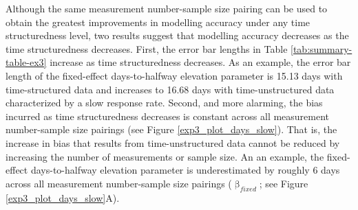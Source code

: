 \documentclass[
12pt, %
twoside,
english]{guelphthesis}
\begin{document}
Although the same measurement number-sample size pairing can be used to obtain the greatest improvements in modelling accuracy under any time structuredness level, two results suggest that modelling accuracy decreases as the time structuredness decreases. First, the error bar lengths in Table \ref{tab:summary-table-ex3} increase as time structuredness decreases. As an example, the error bar length of the fixed-effect days-to-halfway elevation parameter is 15.13 days with time-structured data and increases to 16.68 days with time-unstructured data characterized by a slow response rate. Second, and more alarming, the bias incurred as time structuredness decreases is constant across all measurement number-sample size pairings (see Figure \ref{exp3_plot_days_slow}). That is, the increase in bias that results from time-unstructured data cannot be reduced by increasing the number of measurements or sample size. An an example, the fixed-effect days-to-halfway elevation parameter is underestimated by roughly 6 days across all measurement number-sample size pairings (\(\upbeta_{fixed}\); see Figure \ref{exp3_plot_days_slow}A).
\end{document}
